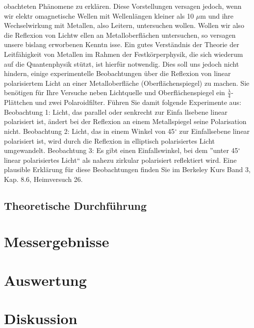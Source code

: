 \documentclass[12pt]{scrartcl}
\begin{document}
\begin{enumerate}
\begin{enumerate}
obachteten Phänomene zu
erklären. Diese Vorstellungen versagen jedoch, wenn wir elektr
omagnetische Wellen mit
Wellenlängen kleiner als
10 $\mu$m und ihre Wechselwirkung mit Metallen, also Leitern,
untersuchen wollen. Wollen wir also die Reflexion von Lichtw
ellen an Metalloberflächen untersuchen, so versagen unsere bislang erworbenen Kenntn
isse. Ein gutes Verständnis der Theorie der Leitfähigkeit von Metallen im Rahmen der Festkörperphysik, die sich
wiederum auf die Quantenphysik stützt, ist hierfür notwendig. Dies soll uns jedoch nicht hindern, einige experimentelle Beobachtungen über die Reflexion von linear polarisiertem Licht an einer Metalloberfläche (Oberflächenspiegel) zu machen. Sie benötigen für Ihre Versuche neben Lichtquelle und Oberflächenspiegel ein
$\frac{\lambda}{4}$-Plättchen und zwei Polaroidfilter.
Führen Sie damit folgende Experimente aus:
Beobachtung 1: Licht, das parallel oder senkrecht zur Einfa
llsebene linear polarisiert ist,
ändert bei der Reflexion an einem Metallspiegel seine Polarisation nicht.
Beobachtung 2: Licht, das in einem Winkel von 45$^\circ$ zur Einfallsebene linear polarisiert ist, wird durch die Reflexion in elliptisch polarisiertes Licht umgewandelt.
Beobachtung 3: Es gibt einen Einfallswinkel, bei dem
”unter 45$^\circ$
linear polarisiertes
Licht“ als nahezu zirkular polarisiert reflektiert wird.
Eine plausible Erklärung für diese Beobachtungen finden Sie im Berkeley Kurs Band 3, Kap. 8.6, Heimversuch 26.
\end{enumerate}
\end{enumerate}

\subsection{Theoretische Durchführung}


\section{Messergebnisse}



\section{Auswertung}


\section{Diskussion}


\end{document}
